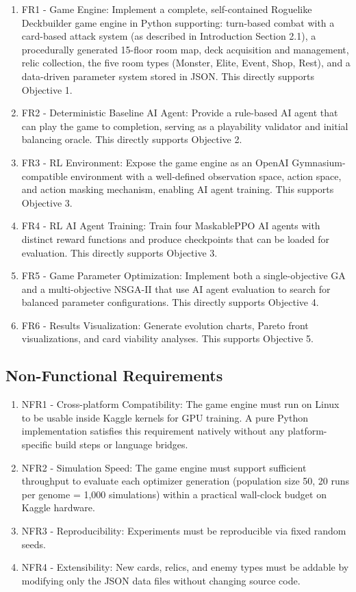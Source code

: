 \begin{enumerate}
    \item FR1 - Game Engine: Implement a complete, self-contained Roguelike Deckbuilder game engine in Python supporting: turn-based combat with a card-based attack system (as described in Introduction Section 2.1), a procedurally generated 15-floor room map, deck acquisition and management, relic collection, the five room types (Monster, Elite, Event, Shop, Rest), and a data-driven parameter system stored in JSON. This directly supports Objective 1.
    \item FR2 - Deterministic Baseline AI Agent: Provide a rule-based AI agent that can play the game to completion, serving as a playability validator and initial balancing oracle. This directly supports Objective 2.
    \item FR3 - RL Environment: Expose the game engine as an OpenAI Gymnasium-compatible environment with a well-defined observation space, action space, and action masking mechanism, enabling AI agent training. This supports Objective 3.
    \item FR4 - RL AI Agent Training: Train four MaskablePPO AI agents with distinct reward functions and produce checkpoints that can be loaded for evaluation. This directly supports Objective 3.
    \item FR5 - Game Parameter Optimization: Implement both a single-objective GA and a multi-objective NSGA-II that use AI agent evaluation to search for balanced parameter configurations. This directly supports Objective 4.
    \item FR6 - Results Visualization: Generate evolution charts, Pareto front visualizations, and card viability analyses. This supports Objective 5.
\end{enumerate}

\subsection{Non-Functional Requirements}

\begin{enumerate}
    \item NFR1 - Cross-platform Compatibility: The game engine must run on Linux to be usable inside Kaggle kernels for GPU training. A pure Python implementation satisfies this requirement natively without any platform-specific build steps or language bridges.
    \item NFR2 - Simulation Speed: The game engine must support sufficient throughput to evaluate each optimizer generation (population size 50, 20 runs per genome = 1,000 simulations) within a practical wall-clock budget on Kaggle hardware.
    \item NFR3 - Reproducibility: Experiments must be reproducible via fixed random seeds.
    \item NFR4 - Extensibility: New cards, relics, and enemy types must be addable by modifying only the JSON data files without changing source code.
\end{enumerate}

